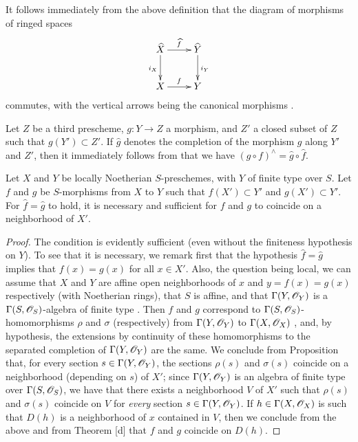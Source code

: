 \begin{env}[10.9.2]
\label{I.10.9.2}
It follows immediately from the above definition that the diagram of morphisms of ringed spaces
\[
  \xymatrix{
    \widehat{X}\ar[r]^{\widehat{f}}\ar[d]_{i_X} &
    \widehat{Y}\ar[d]^{i_Y}\\
    X\ar[r]^f &
    Y
  }
\]
commutes, with the vertical arrows being the canonical morphisms .
\end{env}

\begin{env}[10.9.3]
\label{I.10.9.3}
Let $Z$ be a third prescheme, $g:Y\to Z$ a morphism, and $Z'$ a closed subset of $Z$ such that $g(Y')\subset Z'$.
If $\widehat{g}$ denotes the completion of the morphism $g$ along $Y'$ and $Z'$, then it immediately follows from  that we have $(g\circ f)^\wedge=\widehat{g}\circ\widehat{f}$.
\end{env}

\begin{proposition}[10.9.4]
\label{I.10.9.4}
Let $X$ and $Y$ be locally Noetherian $S$-preschemes, with $Y$ of finite type over $S$.
Let $f$ and $g$ be $S$-morphisms from $X$ to $Y$ such that $f(X')\subset Y'$ and $g(X')\subset Y'$.
For $\widehat{f}=\widehat{g}$ to hold, it is necessary and sufficient for $f$ and $g$ to coincide on a neighborhood of $X'$.
\end{proposition}

\begin{proof}
The condition is evidently sufficient (even without the finiteness hypothesis on $Y$).
To see that it is necessary, we remark first that the hypothesis $\widehat{f}=\widehat{g}$ implies that $f(x)=g(x)$ for all $x\in X'$.
Also, the question being local, we can assume that $X$ and $Y$ are affine open neighborhoods of $x$ and $y=f(x)=g(x)$ respectively (with Noetherian rings), that $S$ is affine, and that $\Gamma(Y,\mathscr{O}_Y)$ is a $\Gamma(S,\mathscr{O}_S)$-algebra of finite type .
Then $f$ and $g$ correspond to $\Gamma(S,\mathscr{O}_S)$-homomorphisms $\rho$ and $\sigma$ (respectively) from $\Gamma(Y,\mathscr{O}_Y)$ to $\Gamma(X,\mathscr{O}_X)$ , and, by hypothesis, the extensions by continuity of these homomorphisms to the separated completion of $\Gamma(Y,\mathscr{O}_Y)$ are the same.
We conclude from Proposition  that, for every section $s\in\Gamma(Y,\mathscr{O}_Y)$, the sections $\rho(s)$ and $\sigma(s)$ coincide on a neighborhood (depending on $s$) of $X'$; since $\Gamma(Y,\mathscr{O}_Y)$ is an algebra of finite type over $\Gamma(S,\mathscr{O}_S)$, we have that there exists a neighborhood $V$ of $X'$ such that $\rho(s)$ and $\sigma(s)$ coincide on $V$ for \emph{every} section $s\in\Gamma(Y,\mathscr{O}_Y)$.
If $h\in\Gamma(X,\mathscr{O}_X)$ is such that $D(h)$ is a neighborhood of $x$ contained in $V$, then we conclude from the above and from Theorem [d] that $f$ and $g$ coincide on $D(h)$.
\end{proof}

